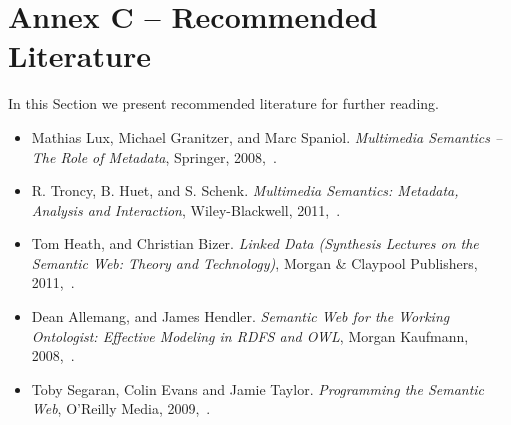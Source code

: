 \documentclass[12pt]{article}
\begin{document}
\section{Annex C -- Recommended Literature}
In this Section we present recommended literature for further reading.
\begin{itemize}
\item Mathias Lux, Michael Granitzer, and Marc Spaniol. \emph{Multimedia Semantics -- The Role of Metadata}, Springer, 2008,~\cite{LGSp08}.
\item R. Troncy, B. Huet, and S. Schenk. \emph{Multimedia Semantics: Metadata, Analysis and Interaction}, Wiley-Blackwell, 2011,~\cite{troncy}.
\item Tom Heath, and Christian Bizer. \emph{Linked Data (Synthesis Lectures on the Semantic Web: Theory and Technology)}, Morgan \& Claypool Publishers, 2011,~\cite{heathbizer}.
\item Dean Allemang, and James Hendler. \emph{Semantic Web for the Working Ontologist: Effective Modeling in RDFS and OWL}, Morgan Kaufmann, 2008,~\cite{Allemang}.
\item Toby Segaran, Colin Evans and Jamie Taylor. \emph{Programming the Semantic Web}, O'Reilly Media, 2009,~\cite{Segaran}.
\end{itemize}

\pagebreak


\end{document}
